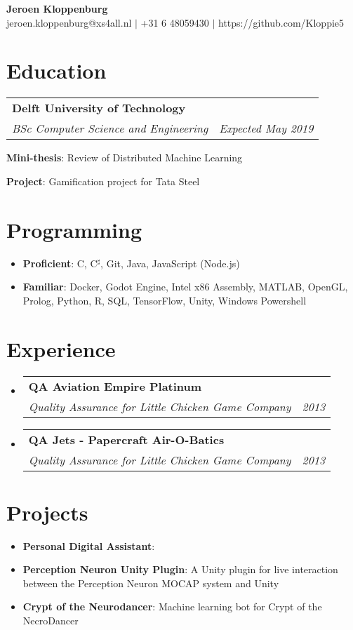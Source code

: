 \documentclass[11pt, a4paper, draft]{article}
\makeatletter
\newcommand{\resumeItem}[2]{
	\item\small{
		\textbf{#1}{: #2 \vspace{-2pt}}
	}
}
\newcommand{\resumeItemNoBullet}[2]{
	\item[]\small{
		\hspace{-9pt}\textbf{#1}{: #2 \vspace{-6pt}}
	}
}
\newcommand{\resumeSubheading}[4]{
	\vspace{-1pt}\item[]
	\begin{tabular*}{0.98\textwidth}{l@{\extracolsep{\fill}}r}
		\hspace{-10pt}\textbf{#1} & #2 \\
		\hspace{-10pt}\textit{\small#3} & \textit{\small #4} \\
	\end{tabular*}\vspace{-5pt}
}
\newcommand{\resumeSubItem}[2]{\resumeItem{#1}{#2}\vspace{-4pt}}
\makeatother
\begin{document}
	
	\begin{center}
		\small \textbf{\Huge Jeroen Kloppenburg} \\
		jeroen.kloppenburg@xs4all.nl $\vert$
		+31 6 48059430 $\vert$
		https://github.com/Kloppie5 \\
	\end{center}
	
	\vspace{-10pt}\section{Education}
	\begin{itemize}[leftmargin=*]
		\resumeSubheading
		{Delft University of Technology}{}
		{BSc Computer Science and Engineering}{Expected May 2019}{
			\resumeItemNoBullet{Mini-thesis}{Review of Distributed Machine Learning}
			\resumeItemNoBullet{Project}{Gamification project for Tata Steel}
		}
	\end{itemize}
	
	\vspace{-10pt}\section{Programming}
	\begin{itemize}[leftmargin=*]
		\small
		\item{
			\textbf{Proficient}{: C, C$^\sharp$, Git, Java, JavaScript (Node.js) }
		}
		\vspace{-5pt}
		\item{
			\textbf{Familiar}{: Docker, Godot Engine, Intel x86 Assembly, MATLAB, OpenGL, Prolog, Python, R, SQL, TensorFlow, Unity, Windows Powershell }
		}
	\end{itemize}
	
	\vspace{-10pt}\section{Experience}
	\begin{itemize}[leftmargin=*]
		
		\resumeSubheading
		{QA Aviation Empire Platinum}{}
		{Quality Assurance for Little Chicken Game Company}{2013}
		\resumeSubheading
		{QA Jets - Papercraft Air-O-Batics}{}
		{Quality Assurance for Little Chicken Game Company}{2013}
		
	\end{itemize}
	
	\vspace{-10pt}\section{Projects}
	\begin{itemize}[leftmargin=*]
		\resumeSubItem{Personal Digital Assistant}
		{}
		\resumeSubItem{Perception Neuron Unity Plugin}
		{A Unity plugin for live interaction between the Perception Neuron MOCAP system and Unity}
		\resumeSubItem{Crypt of the Neurodancer}
		{Machine learning bot for Crypt of the NecroDancer}
	\end{itemize}
\end{document}
